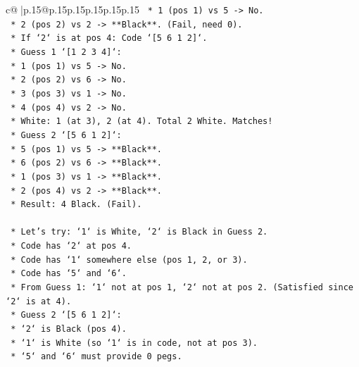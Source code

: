 \documentclass{article}
\begin{document}
{\begin{supertabular}{c@{$\;$}|p{.15\linewidth}@{}p{.15\linewidth}p{.15\linewidth}p{.15\linewidth}p{.15\linewidth}p{.15\linewidth}}
{{{\texttt{                        *   1 (pos 1) vs 5 {-}> No.} \\
\texttt{                        *   2 (pos 2) vs 2 {-}> **Black**. (Fail, need 0).} \\
\texttt{                *   If `2` is at pos 4: Code `{[}5 6 1 2{]}`.} \\
\texttt{                    *   Guess 1 `{[}1 2 3 4{]}`:} \\
\texttt{                        *   1 (pos 1) vs 5 {-}> No.} \\
\texttt{                        *   2 (pos 2) vs 6 {-}> No.} \\
\texttt{                        *   3 (pos 3) vs 1 {-}> No.} \\
\texttt{                        *   4 (pos 4) vs 2 {-}> No.} \\
\texttt{                        *   White: 1 (at 3), 2 (at 4). Total 2 White. Matches!} \\
\texttt{                    *   Guess 2 `{[}5 6 1 2{]}`:} \\
\texttt{                        *   5 (pos 1) vs 5 {-}> **Black**.} \\
\texttt{                        *   6 (pos 2) vs 6 {-}> **Black**.} \\
\texttt{                        *   1 (pos 3) vs 1 {-}> **Black**.} \\
\texttt{                        *   2 (pos 4) vs 2 {-}> **Black**.} \\
\texttt{                        *   Result: 4 Black. (Fail).} \\
\\ 
\texttt{    *   Let's try: `1` is White, `2` is Black in Guess 2.} \\
\texttt{        *   Code has `2` at pos 4.} \\
\texttt{        *   Code has `1` somewhere else (pos 1, 2, or 3).} \\
\texttt{        *   Code has `5` and `6`.} \\
\texttt{        *   From Guess 1: `1` not at pos 1, `2` not at pos 2. (Satisfied since `2` is at 4).} \\
\texttt{        *   Guess 2 `{[}5 6 1 2{]}`:} \\
\texttt{            *   `2` is Black (pos 4).} \\
\texttt{            *   `1` is White (so `1` is in code, not at pos 3).} \\
\texttt{            *   `5` and `6` must provide 0 pegs.} \\
}}}
\end{supertabular}}
\end{document}
